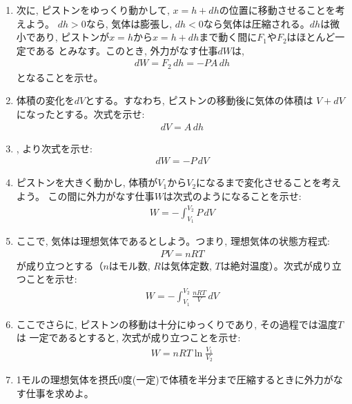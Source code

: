 \begin{q}
\begin{enumerate}
{の圧力によるものかもしれない。この問題ではその詳細は気にしない。}）
を$F_2$とすると, 
\begin{eqnarray}F_2=-PA\label{eq:gas_work2}\end{eqnarray}
となることを示せ。
\item 次に, ピストンをゆっくり動かして, $x=h+dh$の位置に移動させることを考えよう。
$dh>0$なら, 気体は膨張し, $dh<0$なら気体は圧縮される。$dh$は微小であり, 
ピストンが$x=h$から$x=h+dh$まで動く間に$F_1$や$F_2$はほとんど一定である
とみなす。このとき, 外力がなす仕事$dW$は, 
\begin{eqnarray}dW=F_2\,dh=-PA\,dh\label{eq:gas_work3}\end{eqnarray}
となることを示せ。
\item 体積の変化を$dV$とする。すなわち, ピストンの移動後に気体の体積は
$V+dV$になったとする。次式を示せ:
\begin{eqnarray}dV=A\,dh\label{eq:gas_work4}\end{eqnarray}
\item {}, より次式を示せ:
\begin{eqnarray}dW=-P\,dV\label{eq:gas_work5}\end{eqnarray}
\item ピストンを大きく動かし, 体積が$V_1$から$V_2$になるまで変化させることを考えよう。
この間に外力がなす仕事$W$は次式のようになることを示せ:
\begin{eqnarray}
W=-\int_{V_1}^{V_2}P\,dV
\end{eqnarray}
\item ここで, 気体は理想気体であるとしよう。つまり, 理想気体の状態方程式:
\begin{eqnarray}PV=nRT\end{eqnarray}
が成り立つとする（$n$はモル数, $R$は気体定数, $T$は絶対温度）。次式が成り立つことを示せ:
\begin{eqnarray}
W=-\int_{V_1}^{V_2}\frac{nRT}{V}\,dV
\end{eqnarray}
\item ここでさらに, ピストンの移動は十分にゆっくりであり, その過程では温度$T$は
一定であるとすると, 次式が成り立つことを示せ:
\begin{eqnarray}
W=nRT\ln\frac{V_1}{V_2}
\end{eqnarray}
\item 1モルの理想気体を摂氏0度(一定)で体積を半分まで圧縮するときに外力がなす仕事を求めよ。
\end{enumerate}
\end{q}
\vspace{0.2cm}

